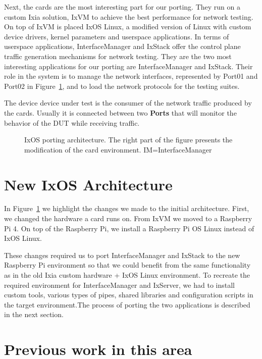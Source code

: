 Next, the cards are the most interesting part for our porting. They run on a
custom Ixia solution, IxVM to achieve the best performance for network testing.
On top of IxVM is placed IxOS Linux, a modified version of Linux with custom
device drivers, kernel parameters and userspace applications. In terms of
userspace applications, InterfaceManager and IxStack offer the control
plane traffic generation mechanisms for network testing. They are the two most
interesting applications for our porting are InterfaceManager and IxStack.
Their role in the system is to manage the network interfaces, represented by
Port01 and Port02 in Figure~\ref{fig:ixos_arch}, and to load the network
protocols for the testing suites.

The device device under test is the consumer of the network traffic produced by
the cards. Usually it is connected between two \textbf{Ports} that will monitor the
behavior of the DUT while receiving traffic.

\begin{figure}
    \centering
    \def\svgscale{0.95}
    
    \caption{IxOS porting architecture. The right part of the figure presents
    the modification of the card environment. \small{IM=InterfaceManager}}
    \label{fig:ixos_arch}
    \medskip
    \small
\end{figure}

\section{New IxOS Architecture}

In Figure~\ref{fig:ixos_arch} we highlight the changes we made to the initial
architecture. First, we changed the hardware a card runs on. From IxVM we moved
to a Raspberry Pi 4. On top of the Raspberry Pi, we install a Raspberry Pi OS Linux
instead of IxOS Linux.

These changes required us to port InterfaceManager and IxStack to the new
Raspberry Pi environment so that we could benefit from the same functionality as
in the old Ixia custom hardware + IxOS Linux environment. To recreate the
required environment for InterfaceManager and IxServer, we had to install custom tools,
various types of pipes, shared libraries and configuration scripts in the target
environment.The process of porting the two applications is described in the next
section.

\section{Previous work in this area}

